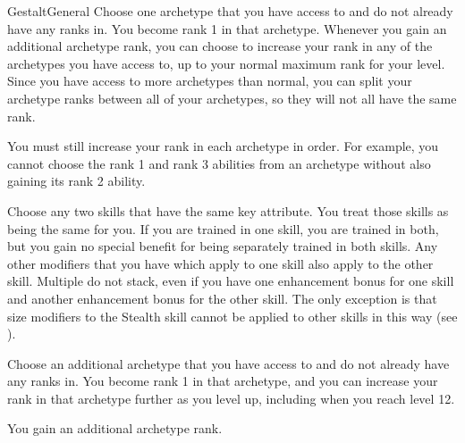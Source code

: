  \begin{feat}{Gestalt}{General}
     Choose one archetype that you have access to and do not already have any ranks in.
    You become rank 1 in that archetype.
    Whenever you gain an additional archetype rank, you can choose to increase your rank in any of the archetypes you have access to, up to your normal maximum rank for your level.
    Since you have access to more archetypes than normal, you can split your archetype ranks between all of your archetypes, so they will not all have the same rank.

    You must still increase your rank in each archetype in order.
    For example, you cannot choose the rank 1 and rank 3 abilities from an archetype without also gaining its rank 2 ability.

     Choose any two skills that have the same key attribute.
    You treat those skills as being the same for you.
    If you are trained in one skill, you are trained in both, but you gain no special benefit for being separately trained in both skills.
    Any other modifiers that you have which apply to one skill also apply to the other skill.
    Multiple  do not stack, even if you have one enhancement bonus for one skill and another enhancement bonus for the other skill.
    The only exception is that size modifiers to the Stealth skill cannot be applied to other skills in this way (see ).

     Choose an additional archetype that you have access to and do not already have any ranks in.
    You become rank 1 in that archetype, and you can increase your rank in that archetype further as you level up, including when you reach level 12.

     You gain an additional archetype rank.
  \end{feat}

